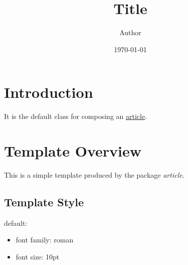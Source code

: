 \documentclass{article}
\title{Title}
\author{Author}
\date{\today}
\providecommand{\tightlist}{
\setlength{\itemsep}{0pt}\setlength{\parskip}{0pt}}
\begin{document}
\maketitle
\tableofcontents
\newpage
\section{Introduction}
{
It is the default class for composing an \href{https://ctan.org/pkg/article}{article}.
}
\section{Template Overview}
{
This is a simple template produced by the package \textit{article}.
}
\subsection{Template Style}
{
default:

\begin{itemize}
\tightlist
\item
font family: roman
\item
font size: 10pt
\end{itemize}
}
\end{document}
